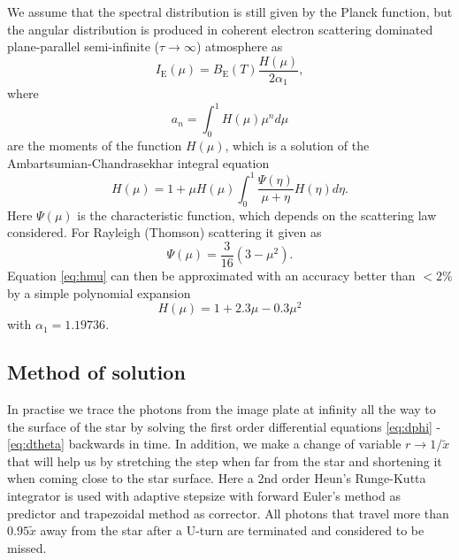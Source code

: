 \documentclass[iop, usenatbib]{emulateapj}
\begin{document}
We assume that the spectral distribution is still given by the Planck function, but the angular distribution is produced in coherent electron scattering dominated plane-parallel semi-infinite ($\tau \rightarrow \infty$) atmosphere as
\begin{equation}
  I_{\mathrm{E}}(\mu) = B_{\mathrm{E}}(T) \frac{H(\mu)}{2\alpha_1},
\end{equation}
where
\begin{equation}
  a_n = \int_0^1 H(\mu) \mu^n d\mu
\end{equation}
are the moments of the function $H(\mu)$, which is a solution of the Ambartsumian-Chandrasekhar integral equation \citep[see e.g.][]{Cha60,Sob63}
\begin{equation}\label{eq:hmu}
  H(\mu) = 1 + \mu H(\mu) \int_0^1 \frac{\Psi(\eta)}{\mu + \eta} H(\eta) d\eta.
\end{equation}
Here $\Psi(\mu)$ is the characteristic function, which depends on the scattering law considered.
For Rayleigh (Thomson) scattering it given as
\begin{equation}
  \Psi(\mu) = \frac{3}{16}(3-\mu^2).
\end{equation}
Equation \eqref{eq:hmu} can then be approximated with an accuracy better than $<2\%$ by a simple polynomial expansion
\begin{equation}
  H(\mu) = 1 + 2.3\mu - 0.3\mu^2
\end{equation}
with $\alpha_1 = 1.19736$.




\subsection{Method of solution}

In practise we trace the photons from the image plate at infinity all the way to the surface of the star by solving the first order differential equations \eqref{eq:dphi} - \eqref{eq:dtheta} backwards in time.
In addition, we make a change of variable $r \rightarrow 1/\tilde{x}$ that will help us by stretching the step when far from the star and shortening it when coming close to the star surface.
Here a 2nd order Heun's Runge-Kutta integrator is used with adaptive stepsize with forward Euler's method as predictor and trapezoidal method as corrector.
All photons that travel more than $0.95\tilde{x}$ away from the star after a U-turn are terminated and considered to be missed.
\end{document}
